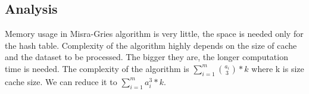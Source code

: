 \subsection{Analysis}
\label{AnalysisMisraGries}
Memory usage in Misra-Gries algorithm is very little, the space is needed only for the hash table. Complexity of the algorithm highly depends on the size of cache and the dataset to be processed. The bigger they are, the longer computation time is needed. The complexity of the algorithm is \(\sum\limits_{i=1}^m{a_i \choose 3}*k\) where k is size cache size. We can reduce it to \(\sum\limits_{i=1}^m{a_i^3}*k\).